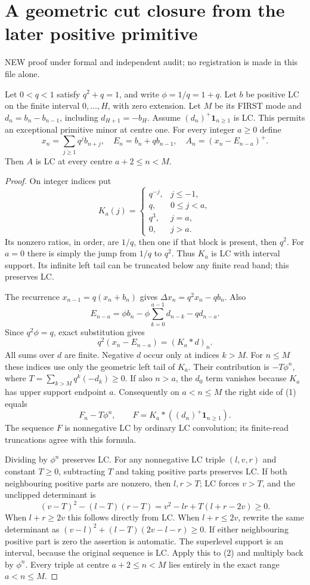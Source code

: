 \section{A geometric cut closure from the later positive primitive}
NEW proof under formal and independent audit; no registration is
made in this file alone.

Let $0<q<1$ satisfy $q^2+q=1$, and write $\phi=1/q=1+q$.
Let $b$ be positive LC on the finite interval $0,\ldots,H$, with
zero extension. Let $M$ be its FIRST mode and $d_n=b_n-b_{n-1}$,
including $d_{H+1}=-b_H$. Assume $(d_n)^+\mathbf1_{n\ge1}$ is LC.
This permits an exceptional primitive minor at centre one.
For every integer $a\ge0$ define
\[
 x_n=\sum_{j\ge1}q^j b_{n+j},\quad E_n=b_n+qb_{n-1},\quad
                         A_n=(x_n-E_{n-a})^+.
\]
Then $A$ is LC at every centre $a+2\le n<M$.

\begin{proof}
On integer indices put
\[
 K_a(j)=\begin{cases}
 q^{-j},&j\le-1,\\
 q,&0\le j<a,\\
 q^3,&j=a,\\
 0,&j>a.
 \end{cases}
\]
Its nonzero ratios, in order, are $1/q$, then one if that block is
present, then $q^2$. For $a=0$ there is simply the jump from $1/q$
to $q^2$. Thus $K_a$ is LC with interval support. Its infinite left
tail can be truncated below any finite read band; this preserves LC.

The recurrence $x_{n-1}=q(x_n+b_n)$ gives
$\Delta x_n=q^2x_n-qb_n$. Also
\[
 E_{n-a}=\phi b_n-\phi\sum_{k=0}^{a-1}d_{n-k}-qd_{n-a}.
\]
Since $q^2\phi=q$, exact substitution gives
\[
                 q^2(x_n-E_{n-a})=(K_a*d)_n.          \tag{1}
\]
All sums over $d$ are finite. Negative $d$ occur only at indices
$k>M$. For $n\le M$ these indices use only the geometric left tail
of $K_a$. Their contribution is $-T\phi^n$, where
$T=\sum_{k>M}q^k(-d_k)\ge0$. If also $n>a$, the $d_0$ term
vanishes because $K_a$ has upper support endpoint $a$.
Consequently on $a<n\le M$ the right side of (1) equals
\[
 F_n-T\phi^n,\qquad
 F=K_a*((d_n)^+\mathbf1_{n\ge1}).                    \tag{2}
\]
The sequence $F$ is nonnegative LC by ordinary LC convolution;
its finite-read truncations agree with this formula.

Dividing by $\phi^n$ preserves LC. For any nonnegative LC triple
$(l,v,r)$ and constant $T\ge0$, subtracting $T$ and taking positive
parts preserves LC. If both neighbouring positive parts are nonzero,
then $l,r>T$; LC forces $v>T$, and the unclipped determinant is
\[
 (v-T)^2-(l-T)(r-T)
   =v^2-lr+T(l+r-2v)\ge0.
\]
When $l+r\ge2v$ this follows directly from LC. When $l+r\le2v$,
rewrite the same determinant as
$(v-l)^2+(l-T)(2v-l-r)\ge0$. If either neighbouring positive part
is zero the assertion is automatic. The superlevel support is an
interval, because the original sequence is LC. Apply this to (2)
and multiply back by $\phi^n$. Every triple at centre
$a+2\le n<M$ lies entirely in the exact range $a<n\le M$.
\end{proof}

